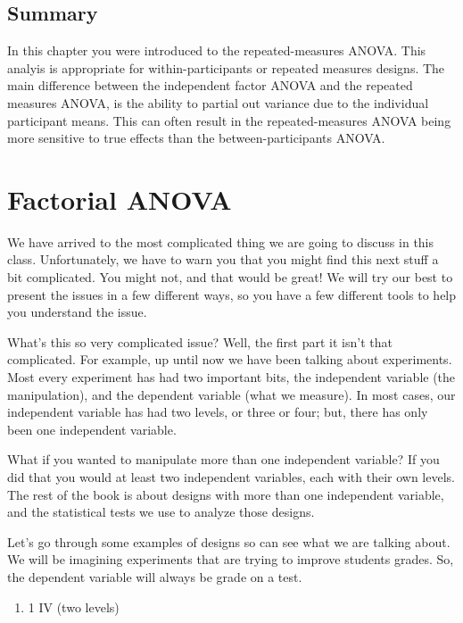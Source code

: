 \documentclass[
]{book}
\providecommand{\tightlist}{%
  \setlength{\itemsep}{0pt}\setlength{\parskip}{0pt}}
\begin{document}
\section{Summary}\label{summary-3}

In this chapter you were introduced to the repeated-measures ANOVA. This analyis is appropriate for within-participants or repeated measures designs. The main difference between the independent factor ANOVA and the repeated measures ANOVA, is the ability to partial out variance due to the individual participant means. This can often result in the repeated-measures ANOVA being more sensitive to true effects than the between-participants ANOVA.

\chapter{Factorial ANOVA}\label{factorial-anova}

We have arrived to the most complicated thing we are going to discuss in this class. Unfortunately, we have to warn you that you might find this next stuff a bit complicated. You might not, and that would be great! We will try our best to present the issues in a few different ways, so you have a few different tools to help you understand the issue.

What's this so very complicated issue? Well, the first part it isn't that complicated. For example, up until now we have been talking about experiments. Most every experiment has had two important bits, the independent variable (the manipulation), and the dependent variable (what we measure). In most cases, our independent variable has had two levels, or three or four; but, there has only been one independent variable.

What if you wanted to manipulate more than one independent variable? If you did that you would at least two independent variables, each with their own levels. The rest of the book is about designs with more than one independent variable, and the statistical tests we use to analyze those designs.

Let's go through some examples of designs so can see what we are talking about. We will be imagining experiments that are trying to improve students grades. So, the dependent variable will always be grade on a test.

\begin{enumerate}
\def\labelenumi{\arabic{enumi}.}
\tightlist
\item
  1 IV (two levels)
\end{enumerate}
\end{document}
